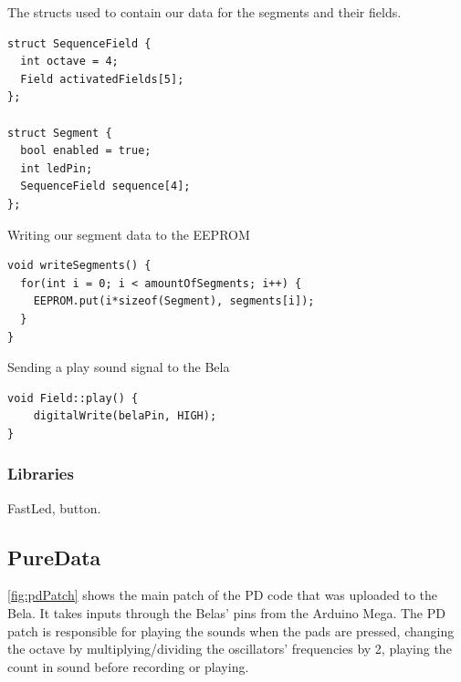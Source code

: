 		\begin{listing}[H]
			\caption{The structs used to contain our data for the segments and their fields.}
			\label{listing:structs}
			\begin{verbatim}
struct SequenceField {
  int octave = 4;
  Field activatedFields[5];
};

struct Segment {
  bool enabled = true;
  int ledPin;
  SequenceField sequence[4];
};
			\end{verbatim}
		\end{listing}
		
		\begin{listing}[H]
			\caption{Writing our segment data to the EEPROM}
			\label{listing:writeSegment}
			\begin{verbatim}
void writeSegments() {
  for(int i = 0; i < amountOfSegments; i++) {
	EEPROM.put(i*sizeof(Segment), segments[i]);
  }
}
			\end{verbatim}
		\end{listing}
	
		\begin{listing}[H]
			\caption{Sending a play sound signal to the Bela}
			\label{listing:playSound}
			\begin{verbatim}
void Field::play() {
	digitalWrite(belaPin, HIGH);
}
			\end{verbatim}
		\end{listing}
	
		\subsubsection{Libraries}%
			FastLed, button.
	\subsection{PureData}%
	\autoref{fig:pdPatch} shows the main patch of the PD code that was uploaded to the Bela. It takes inputs through the Belas' pins from the Arduino Mega. The PD patch is responsible for playing the sounds when the pads are pressed, changing the octave by multiplying/dividing the oscillators' frequencies by 2, playing the count in sound before recording or playing.
	

